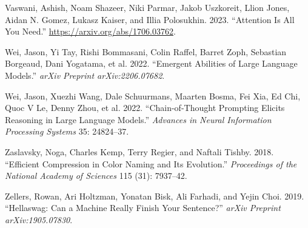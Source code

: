 \documentclass[
]{article}
\newlength{\cslhangindent}
\newenvironment{CSLReferences}[2] %
 {\begin{list}{}{%
  \setlength{\itemindent}{0pt}
  \setlength{\leftmargin}{0pt}
  \setlength{\parsep}{0pt}
  \ifodd #1
   \setlength{\leftmargin}{\cslhangindent}
   \setlength{\itemindent}{-1\cslhangindent}
  \fi
  \setlength{\itemsep}{#2\baselineskip}}}
 {\end{list}}
\begin{document}
\begin{CSLReferences}{1}{0}
Vaswani, Ashish, Noam Shazeer, Niki Parmar, Jakob Uszkoreit, Llion
Jones, Aidan N. Gomez, Lukasz Kaiser, and Illia Polosukhin. 2023.
{``Attention Is All You Need.''} \url{https://arxiv.org/abs/1706.03762}.

Wei, Jason, Yi Tay, Rishi Bommasani, Colin Raffel, Barret Zoph,
Sebastian Borgeaud, Dani Yogatama, et al. 2022. {``Emergent Abilities of
Large Language Models.''} \emph{arXiv Preprint arXiv:2206.07682}.

Wei, Jason, Xuezhi Wang, Dale Schuurmans, Maarten Bosma, Fei Xia, Ed
Chi, Quoc V Le, Denny Zhou, et al. 2022. {``Chain-of-Thought Prompting
Elicits Reasoning in Large Language Models.''} \emph{Advances in Neural
Information Processing Systems} 35: 24824--37.

Zaslavsky, Noga, Charles Kemp, Terry Regier, and Naftali Tishby. 2018.
{``Efficient Compression in Color Naming and Its Evolution.''}
\emph{Proceedings of the National Academy of Sciences} 115 (31):
7937--42.

Zellers, Rowan, Ari Holtzman, Yonatan Bisk, Ali Farhadi, and Yejin Choi.
2019. {``Hellaswag: Can a Machine Really Finish Your Sentence?''}
\emph{arXiv Preprint arXiv:1905.07830}.

\end{CSLReferences}
\end{document}
